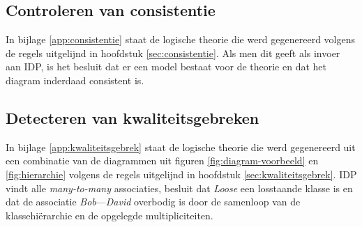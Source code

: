 \subsection{Controleren van consistentie}
In bijlage \ref{app:consistentie} staat de logische theorie die werd gegenereerd volgens de regels uitgelijnd in hoofdstuk \ref{sec:consistentie}. Als men dit geeft als invoer aan IDP, is het besluit dat er een model bestaat voor de theorie en dat het diagram inderdaad consistent is.

\subsection{Detecteren van kwaliteitsgebreken}
In bijlage \ref{app:kwaliteitsgebrek} staat de logische theorie die werd gegenereerd uit een combinatie van de diagrammen uit figuren \ref{fig:diagram-voorbeeld} en \ref{fig:hierarchie} volgens de regels uitgelijnd in hoofdstuk \ref{sec:kwaliteitsgebrek}. IDP vindt alle \textit{many-to-many} associaties, besluit dat \textit{Loose} een losstaande klasse is en dat de associatie \textit{Bob}---\textit{David} overbodig is door de samenloop van de klassehi\"erarchie en de opgelegde multipliciteiten.